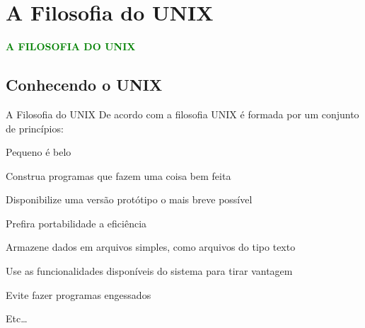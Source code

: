 \documentclass{beamer}
\begin{document}
\section{A Filosofia do UNIX}
  \begin{frame}
     \begin{center}
        \Large{\textcolor{green}{\textbf{A FILOSOFIA DO UNIX}}}
     \end{center}
   \end{frame}
  \subsection{Conhecendo o UNIX}    
   \begin{frame}[t]{A Filosofia do UNIX}
      De acordo com \cite{GM1995} a filosofia UNIX é formada por um conjunto de princípios:
      \begin{itemize}
	\vspace{\baselineskip}
	{\item Pequeno é belo}
	{\item Construa programas que fazem uma coisa bem feita}
	{\item Disponibilize uma versão protótipo o mais breve possível}
	{\item Prefira portabilidade a eficiência}
	{\item Armazene dados em arquivos simples, como arquivos do tipo texto}
	{\item Use as funcionalidades disponíveis do sistema para tirar vantagem}
	{\item Evite fazer programas engessados}
	{\item Etc\dots}
      \end{itemize}
   \end{frame}
\end{document}
